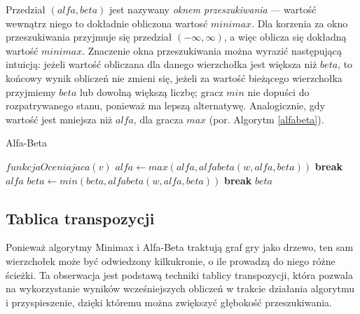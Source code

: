\documentclass{pracamgr}
\begin{document}
Przedział \((alfa, beta)\) jest nazywany \emph{oknem przeszukiwania} --- wartość wewnątrz niego to dokładnie obliczona wartosć \(minimax\).
Dla korzenia za okno przeszukiwania przyjmuje się przedział \((-\infty, \infty)\), a więc oblicza się dokładną wartość \(minimax\).
Znaczenie okna przeszukiwania można wyrazić następującą intuicją: jeżeli wartość obliczana dla danego wierzchołka jest większa niż \(beta\), to końcowy wynik obliczeń nie zmieni się, jeżeli za wartość bieżącego wierzchołka przyjmiemy \(beta\) lub dowolną większą liczbę; gracz \(min\) nie dopuści do rozpatrywanego stanu, ponieważ ma lepszą alternatywę.
Analogicznie, gdy wartość jest mniejsza niż \(alfa\), dla gracza \(max\) (por. Algorytm \ref{alfabeta}).

\begin{algorytm}
\caption{Alfa-Beta\label{alfabeta}}
\begin{algorithmic}[1]
	\State \Return $funkcjaOceniajaca(v)$
\EndIf
        \State $alfa \gets max(alfa, alfabeta(w, alfa, beta))$
            \State \textbf{break}
        \EndIf
    \EndFor
	\State \Return $alfa$
\Else
        \State $beta \gets min(beta, alfabeta(w, alfa, beta))$
            \State \textbf{break}
        \EndIf
    \EndFor
	\State \Return $beta$
\EndIf
\EndFunction
\end{algorithmic}
\end{algorytm}

\subsection{Tablica transpozycji}

Ponieważ algorytmy Minimax i Alfa-Beta traktują graf gry jako drzewo, ten sam wierzchołek może być odwiedzony kilkukronie, o ile prowadzą do niego różne ścieżki.
Ta obserwacja jest podstawą techniki tablicy transpozycji, która pozwala na wykorzystanie wyników wcześniejszych obliczeń w trakcie działania algorytmu i przyspieszenie, dzięki któremu można zwiększyć głębokość przeszukiwania.
\end{document}
